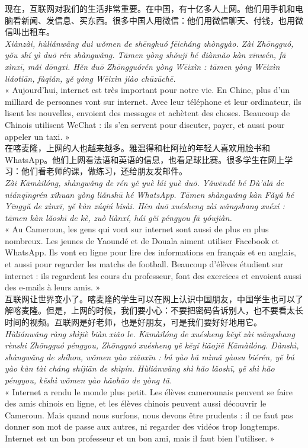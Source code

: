 \documentclass[11pt]{article}
\begin{document}
\begin{textebox}
现在，互联网对我们的生活非常重要。在中国，有十亿多人上网。他们用手机和电脑看新闻、发信息、买东西。很多中国人用微信：他们用微信聊天、付钱，也用微信叫出租车。\\
\emph{Xiànzài, hùliánwǎng duì wǒmen de shēnghuó fēicháng zhòngyào. Zài Zhōngguó, yǒu shí yì duō rén shàngwǎng. Tāmen yòng shǒujī hé diànnǎo kàn xīnwén, fā xìnxī, mǎi dōngxi. Hěn duō Zhōngguórén yòng Wēixìn : tāmen yòng Wēixìn liáotiān, fùqián, yě yòng Wēixìn jiào chūzūchē.}\\
« Aujourd'hui, internet est très important pour notre vie. En Chine, plus d'un milliard de personnes vont sur internet. Avec leur téléphone et leur ordinateur, ils lisent les nouvelles, envoient des messages et achètent des choses. Beaucoup de Chinois utilisent WeChat : ils s'en servent pour discuter, payer, et aussi pour appeler un taxi. »\\[4pt]
在喀麦隆，上网的人也越来越多。雅温得和杜阿拉的年轻人喜欢用脸书和WhatsApp。他们上网看法语和英语的信息，也看足球比赛。很多学生在网上学习：他们看老师的课，做练习，还给朋友发邮件。\\
\emph{Zài Kāmàilóng, shàngwǎng de rén yě yuè lái yuè duō. Yǎwēndé hé Dù'ālā de niánqīngrén xǐhuan yòng liǎnshū hé WhatsApp. Tāmen shàngwǎng kàn Fǎyǔ hé Yīngyǔ de xìnxī, yě kàn zúqiú bǐsài. Hěn duō xuésheng zài wǎngshang xuéxí : tāmen kàn lǎoshī de kè, zuò liànxí, hái gěi péngyou fā yóujiàn.}\\
« Au Cameroun, les gens qui vont sur internet sont aussi de plus en plus nombreux. Les jeunes de Yaoundé et de Douala aiment utiliser Facebook et WhatsApp. Ils vont en ligne pour lire des informations en français et en anglais, et aussi pour regarder les matchs de football. Beaucoup d'élèves étudient sur internet : ils regardent les cours du professeur, font des exercices et envoient aussi des e-mails à leurs amis. »\\[4pt]
互联网让世界变小了。喀麦隆的学生可以在网上认识中国朋友，中国学生也可以了解喀麦隆。但是，上网的时候，我们要小心：不要把密码告诉别人，也不要看太长时间的视频。互联网是好老师，也是好朋友，可是我们要好好地用它。\\
\emph{Hùliánwǎng ràng shìjiè biàn xiǎo le. Kāmàilóng de xuésheng kěyǐ zài wǎngshang rènshi Zhōngguó péngyou, Zhōngguó xuésheng yě kěyǐ liǎojiě Kāmàilóng. Dànshì, shàngwǎng de shíhou, wǒmen yào xiǎoxīn : bú yào bǎ mìmǎ gàosu biérén, yě bú yào kàn tài cháng shíjiān de shìpín. Hùliánwǎng shì hǎo lǎoshī, yě shì hǎo péngyou, kěshì wǒmen yào hǎohāo de yòng tā.}\\
« Internet a rendu le monde plus petit. Les élèves camerounais peuvent se faire des amis chinois en ligne, et les élèves chinois peuvent aussi découvrir le Cameroun. Mais quand nous surfons, nous devons être prudents : il ne faut pas donner son mot de passe aux autres, ni regarder des vidéos trop longtemps. Internet est un bon professeur et un bon ami, mais il faut bien l'utiliser. »
\end{textebox}
\end{document}
